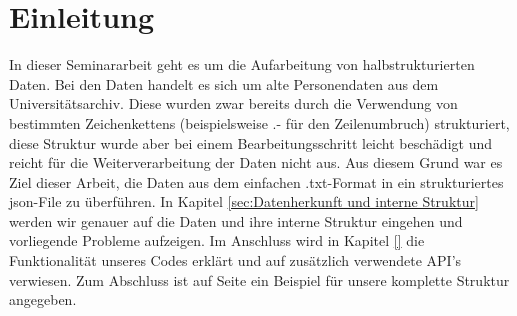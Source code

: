 \section{Einleitung}
 \label{sec:Einleitung}

In dieser Seminararbeit geht es um die Aufarbeitung von halbstrukturierten Daten. Bei den Daten handelt es sich um alte Personendaten aus dem Universitätsarchiv. Diese wurden zwar bereits durch die Verwendung von bestimmten Zeichenkettens (beispielsweise .- für den Zeilenumbruch) strukturiert, diese Struktur wurde aber bei einem Bearbeitungsschritt leicht beschädigt und reicht für die Weiterverarbeitung der Daten nicht aus. Aus diesem Grund war es Ziel dieser Arbeit, die Daten aus dem einfachen .txt-Format in ein strukturiertes json-File zu überführen. In Kapitel \ref{sec:Datenherkunft und interne Struktur} werden wir genauer auf die Daten und ihre interne Struktur eingehen und vorliegende Probleme aufzeigen. Im Anschluss wird in Kapitel \ref{} die Funktionalität unseres Codes erklärt und auf zusätzlich verwendete API's verwiesen. Zum Abschluss ist auf Seite \pageref{sec:Beispielstruktur} ein Beispiel für unsere komplette Struktur angegeben.